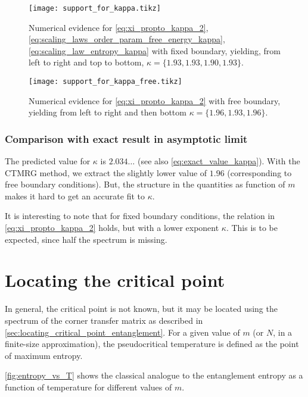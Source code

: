 \begin{figure}
  \texttt{[image: support\_for\_kappa.tikz]}
  \caption{Numerical evidence for \autoref{eq:xi_propto_kappa_2}, \autoref{eq:scaling_laws_order_param_free_energy_kappa},
  \autoref{eq:scaling_law_entropy_kappa} with fixed boundary, yielding, from left to right and top to bottom, $\kappa = \{ 1.93, 1.93, 1.90,
  1.93 \}$.}\label{fig:support_for_kappa}
\end{figure}

\begin{figure}
  \texttt{[image: support\_for\_kappa\_free.tikz]}
  \caption{Numerical evidence for \autoref{eq:xi_propto_kappa_2} with free boundary,
  yielding from left to right and then bottom $\kappa = \{ 1.96,
  1.93, 1.96 \}$.}\label{fig:support_for_kappa_free} \end{figure}

\subsubsection{Comparison with exact result in asymptotic limit}

The predicted value for $\kappa$ \cite{pollmann2009theory} is $2.034\dots$ (see also \autoref{eq:exact_value_kappa}).
With the CTMRG method, we extract the slightly lower value of $1.96$ (corresponding to free boundary conditions).
But, the structure in the quantities as function of $m$ makes it hard to get an accurate fit to $\kappa$.

It is interesting to note that for fixed boundary conditions, the relation in \autoref{eq:xi_propto_kappa_2} holds,
but with a lower exponent $\kappa$. This is to be expected, since half the spectrum is missing.

\section{Locating the critical point}\label{sec:locating_the_critical_point}

In general, the critical point is not known, but it may be located using the spectrum of the corner transfer matrix as
described in \autoref{sec:locating_critical_point_entanglement}. For a given value of $m$ (or $N$, in a finite-size approximation), the pseudocritical temperature is defined as the point of maximum entropy.

\autoref{fig:entropy_vs_T} shows the classical analogue to the entanglement entropy as a function of temperature for
different values of $m$.

